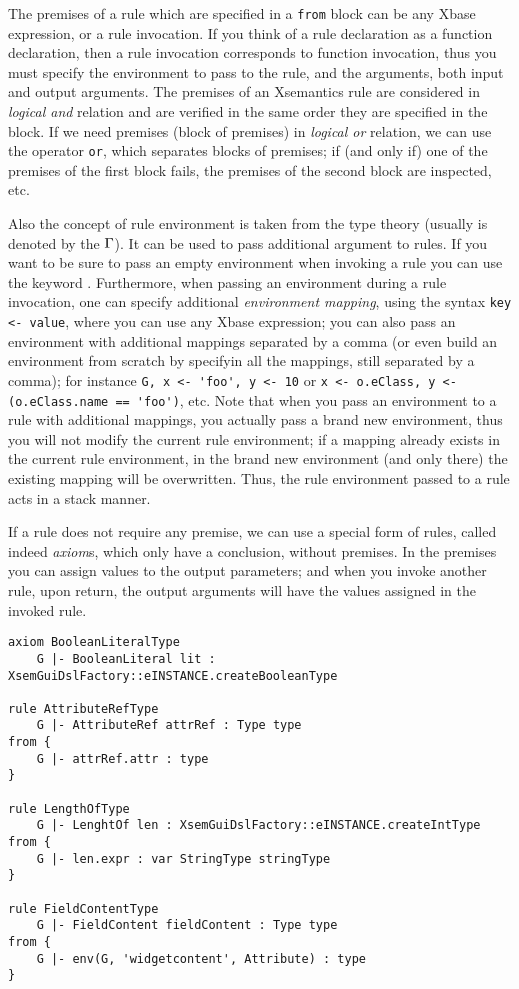 The premises of a rule which are specified in a \verb|from| block can be any
Xbase expression, or a rule invocation.  If you think of a rule declaration as a
function declaration, then a rule invocation corresponds to function invocation,
thus you must specify the environment to pass to the rule, and the arguments,
both input and output arguments.
The premises of an Xsemantics rule are considered in \emph{logical and} relation
and are verified in the same order they are specified in the block.
If we need premises (block of premises) in \emph{logical or} relation, we can
use the operator \verb|or|, which separates blocks of premises; if (and only if) one
of the premises of the first block fails, the premises of the second block are
inspected, etc.

Also the concept of rule environment is taken from the type theory (usually is
denoted by the $\Gamma$).  It can be used to pass additional argument to rules.
If you want to be sure to pass an empty environment when invoking a rule you can
use the keyword .
Furthermore, when passing an environment during a rule invocation, one
can specify additional \emph{environment mapping}, using the syntax
\lstinline[breakatwhitespace=false,breaklines=true]!key <- value!, 
where you can use any Xbase expression;
you can also pass an environment with additional
mappings separated by a comma (or even build an environment from scratch
by specifyin all the mappings, still separated by a comma); for instance
\lstinline[breakatwhitespace=false,breaklines=true]!G, x <- 'foo', y <- 10! 
or
\lstinline[breakatwhitespace=false,breaklines=true]!x <- o.eClass, y <- (o.eClass.name == 'foo')!, 
etc.
Note that when you pass an environment to a rule with additional mappings,
you actually pass a brand new environment, thus you will not modify the
current rule environment; if a mapping already exists in the current rule
environment, in the brand new environment (and only there) the existing mapping
will be overwritten.  Thus, the rule environment passed to a rule acts
in a stack manner.

If a rule does not require any premise, we can use a special form of
rules, called indeed \textit{axiom}s, which only have a conclusion, without
premises.
In the premises you can assign values to the output parameters; and when you
invoke another rule, upon return, the output arguments will have the values
assigned in the invoked rule.

\begin{lstlisting}[language=xsemantics,float,label=lst:xsem-firstrules,caption=Some
examples of rules and axioms in Xsemantics.]
axiom BooleanLiteralType
	G |- BooleanLiteral lit : XsemGuiDslFactory::eINSTANCE.createBooleanType

rule AttributeRefType
	G |- AttributeRef attrRef : Type type
from {
	G |- attrRef.attr : type
}

rule LengthOfType
	G |- LenghtOf len : XsemGuiDslFactory::eINSTANCE.createIntType
from {
	G |- len.expr : var StringType stringType
}

rule FieldContentType
	G |- FieldContent fieldContent : Type type
from {
	G |- env(G, 'widgetcontent', Attribute) : type
}
\end{lstlisting}

